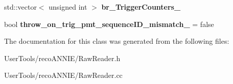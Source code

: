 \begin{DoxyCompactItemize}
\item 
\hypertarget{classannie_1_1RawReader_a2e9081d4b61053fbc3dffb3b51c7ab6e}{std\-::vector$<$ unsigned int $>$ {\bfseries br\-\_\-\-Trigger\-Counters\-\_\-}}\label{classannie_1_1RawReader_a2e9081d4b61053fbc3dffb3b51c7ab6e}

\item 
\hypertarget{classannie_1_1RawReader_a4854cab5500972fd0136b3f971b58cb3}{bool {\bfseries throw\-\_\-on\-\_\-trig\-\_\-pmt\-\_\-sequence\-I\-D\-\_\-mismatch\-\_\-} = false}\label{classannie_1_1RawReader_a4854cab5500972fd0136b3f971b58cb3}

\end{DoxyCompactItemize}


The documentation for this class was generated from the following files\-:\begin{DoxyCompactItemize}
\item 
User\-Tools/reco\-A\-N\-N\-I\-E/Raw\-Reader.\-h\item 
User\-Tools/reco\-A\-N\-N\-I\-E/Raw\-Reader.\-cc\end{DoxyCompactItemize}
